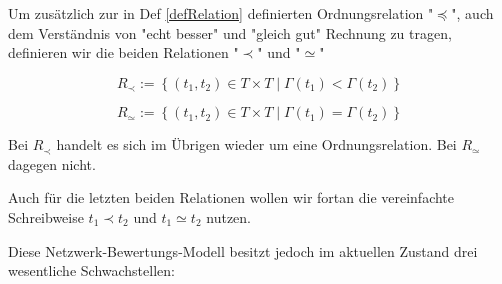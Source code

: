 \begin{Def}\label{defRelationen}

Um zusätzlich zur in Def \ref{defRelation} definierten Ordnungsrelation "$\preceq$", auch dem Verständnis von "echt besser" und "gleich gut" Rechnung zu tragen, definieren wir die beiden Relationen "$\prec$" und "$\simeq$"

\vspace{0.3cm}

\begin{equation*}
  R_{\prec}:= \left\{ (t_1, t_2) \in T \times T \mid \Gamma(t_1) < \Gamma(t_2) \right\}
\end{equation*}

\begin{equation*}
  R_{\simeq}:= \left\{ (t_1, t_2) \in T \times T \mid \Gamma(t_1) = \Gamma(t_2) \right\}
\end{equation*}

\vspace{1cm}

Bei $R_{\prec}$ handelt es sich im Übrigen wieder um eine Ordnungsrelation. Bei $R_{\simeq}$ dagegen nicht.

\end{Def}

\vspace{0.3cm}

Auch für die letzten beiden Relationen wollen wir fortan die vereinfachte Schreibweise $t_1 \prec t_2$ und $t_1 \simeq t_2$ nutzen. 

\vspace{1cm}

Diese Netzwerk-Bewertungs-Modell besitzt jedoch im aktuellen Zustand drei wesentliche Schwachstellen:

